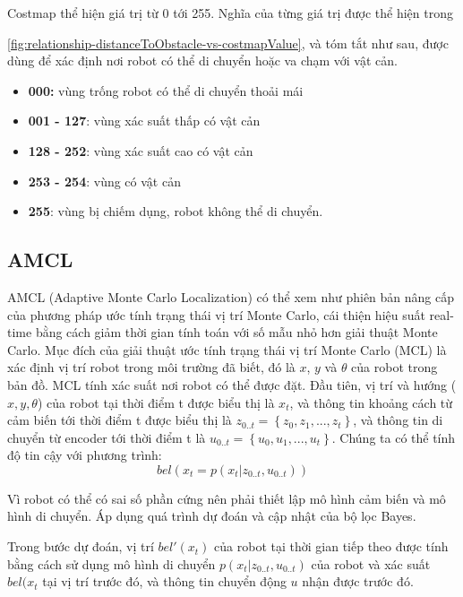 {Costmap thể hiện giá trị từ 0 tới 255. Nghĩa của từng giá trị được thể hiện trong \figurename{\ref{fig:relationship-distanceToObstacle-vs-costmapValue}, và tóm tắt như sau, được dùng để xác định nơi robot có thể di chuyển hoặc va chạm với vật cản.

\begin{itemize}
  \item \textbf{000:} vùng trống robot có thể di chuyển thoải mái
  \item \textbf{001 - 127}: vùng xác suất thấp có vật cản
  \item \textbf{128 - 252}: vùng xác suất cao có vật cản
  \item \textbf{253 - 254}: vùng có vật cản
  \item \textbf{255}: vùng bị chiếm dụng, robot không thể di chuyển.
\end{itemize}

\subsection{AMCL}
AMCL (Adaptive Monte Carlo Localization) có thể xem như phiên bản nâng cấp của phương pháp ước tính trạng thái vị trí Monte Carlo, cái thiện hiệu suất real-time bằng cách giảm thời gian tính toán với số mẫu nhỏ hơn giải thuật Monte Carlo.
Mục đích của giải thuật ước tính trạng thái vị trí Monte Carlo (MCL) là xác định vị trí robot trong môi trường đã biết, đó là $x$, $y$ và $\theta$ của robot trong bản đồ.
MCL tính xác suất nơi robot có thể được đặt. Đầu tiên, vị trí và hướng ($x, y, \theta$) của robot tại thời điểm t được biểu thị là ${x}_{t}$,
và thông tin khoảng cách từ cảm biến tới thời điểm t được biểu thị là ${z}_{0..t} = \left\{{z}_{0}, {z}_{1}, ..., {z}_{t}\right\}$, và thông tin di chuyển từ encoder tới thời điểm t là ${u}_{0..t} = \left\{{u}_{0}, {u}_{1}, ..., {u}_{t}\right\}$. Chúng ta có thể tính độ tin cậy với phương trình:
\begin{equation}
  bel({x}_{t} = p\left({x}_ {t}|{z}_{0..t}, {u}_{0..t}\right))
\end{equation}

Vì robot có thể có sai số phần cứng nên phải thiết lập mô hình cảm biến và mô hình di chuyển. Áp dụng quá trình dự đoán và cập nhật của bộ lọc Bayes.

Trong bước dự đoán, vị trí $bel'\left({x}_{t}\right)$ của robot tại thời gian tiếp theo được tính bằng cách sử dụng mô hình di chuyển $p\left({x}_ {t}|{z}_{0..t}, {u}_{0..t}\right)$ của robot và xác suất $bel({x}_{t}$ tại vị trí trước đó, và thông tin chuyển động $u$ nhận được trước đó.

}}

